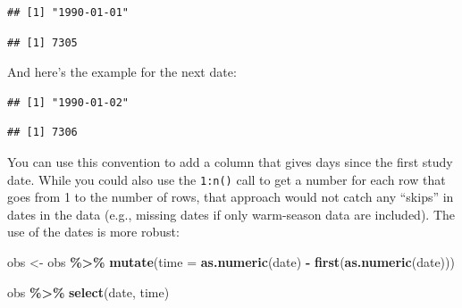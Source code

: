 \documentclass[
]{book}
\newenvironment{Shaded}{\begin{snugshade}}{\end{snugshade}}
\newcommand{\AttributeTok}[1]{\textcolor[rgb]{0.13,0.29,0.53}{#1}}
\newcommand{\DecValTok}[1]{\textcolor[rgb]{0.00,0.00,0.81}{#1}}
\newcommand{\FunctionTok}[1]{\textcolor[rgb]{0.13,0.29,0.53}{\textbf{#1}}}
\newcommand{\NormalTok}[1]{#1}
\newcommand{\OtherTok}[1]{\textcolor[rgb]{0.56,0.35,0.01}{#1}}
\newcommand{\SpecialCharTok}[1]{\textcolor[rgb]{0.81,0.36,0.00}{\textbf{#1}}}
\begin{document}
\begin{verbatim}
## [1] "1990-01-01"
\end{verbatim}

\begin{Shaded}
\end{Shaded}

\begin{verbatim}
## [1] 7305
\end{verbatim}

And here's the example for the next date:

\begin{Shaded}
\end{Shaded}

\begin{verbatim}
## [1] "1990-01-02"
\end{verbatim}

\begin{Shaded}
\end{Shaded}

\begin{verbatim}
## [1] 7306
\end{verbatim}

You can use this convention to add a column that gives days since the first
study date. While you could also use the \texttt{1:n()} call to get a number for
each row that goes from 1 to the number of rows, that approach would not
catch any ``skips'' in dates in the data (e.g., missing dates if only warm-season
data are included). The use of the dates is more robust:

\begin{Shaded}
\begin{Highlighting}[]
\NormalTok{obs }\OtherTok{\textless{}{-}}\NormalTok{ obs }\SpecialCharTok{\%\textgreater{}\%} 
  \FunctionTok{mutate}\NormalTok{(}\AttributeTok{time =} \FunctionTok{as.numeric}\NormalTok{(date) }\SpecialCharTok{{-}} \FunctionTok{first}\NormalTok{(}\FunctionTok{as.numeric}\NormalTok{(date)))}

\NormalTok{obs }\SpecialCharTok{\%\textgreater{}\%} 
  \FunctionTok{select}\NormalTok{(date, time)}
\end{Highlighting}
\end{Shaded}
\end{document}
